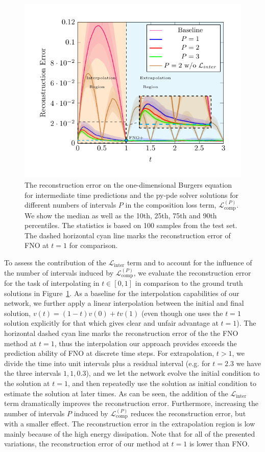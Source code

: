 \documentclass{article}
\theoremstyle{plain}
\theoremstyle{definition}
\theoremstyle{remark}
\newcommand{\lcomp}{{{\mathcal{L}}^{(P)}_{\text{comp}}}}
\newcommand{\linter}{{{\mathcal{L}}_{\text{inter}}}}
\begin{document}
\begin{figure}[t]
    \centering
  \includegraphics[width=0.55\linewidth]{figures/burgers_error_over_time.pdf}
\caption{ The reconstruction error on the one-dimensional Burgers equation for intermediate time predictions and the py-pde solver solutions for different numbers of intervals $P$ in the composition loss term, $\lcomp$. We show the median as well as the 10th, 25th, 75th and 90th percentiles. The statistics is based on 100 samples from the test set. The dashed horizontal cyan line marks the reconstruction error of FNO at $t=1$ for comparison.
}
  \label{fig:compose_0_1}

\end{figure}



To assess the contribution of the $\linter$ term and to account for the influence of the number of intervals induced by $\lcomp$, we evaluate the reconstruction error for the task of interpolating in $t\in[0,1]$ in comparison to the ground truth solutions in Figure~\ref{fig:compose_0_1}. As a baseline for the interpolation capabilities of our network, we further apply a linear interpolation between the initial and final solution, $v(t) = (1-t)v(0) + t v(1)$ (even though one uses the $t=1$ solution explicitly for that which gives clear and unfair advantage at $t=1$). The horizontal dashed cyan line marks the reconstruction error of the the FNO method at $t=1$, thus the interpolation our approach provides exceeds the prediction ability of FNO at discrete time steps. 
For extrapolation, $t>1$, we divide the time into unit intervals plus a residual interval (e.g. for $t=2.3$ we have the three intervals $1,1,0.3$), and we let the network evolve the initial condition to the solution at $t=1$, and then repeatedly use the solution as initial condition to estimate the solution at later times. As can be seen, the addition of the $\linter$ term dramatically improves the reconstruction error. Furthermore, increasing the number of intervals $P$ induced by $\lcomp$ reduces the reconstruction error, but with a smaller effect. The reconstruction error in the extrapolation region is low mainly because of the high energy dissipation. Note that for all of the presented variations, the reconstruction error of our method at $t=1$ is lower than FNO.
\end{document}
